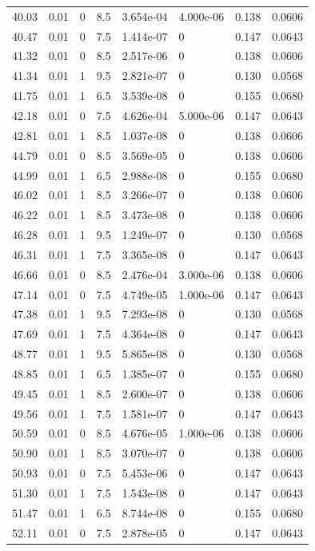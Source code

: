 \documentclass[preview]{standalone}
\begin{document}
{{{\begin{tabular}{L{1.2cm}C{1.2cm} C{0.3cm}C{0.5cm} C{1.4cm}C{1.4cm} C{1.4cm}C{1.4cm}}
  40.03  &  0.01  & 0     & 8.5 &  3.654e-04  & 4.000e-06  & 0.138 &  0.0606   \\ 
  40.47  &  0.01  & 0     & 7.5 &  1.414e-07  & 0  & 0.147 &  0.0643   \\ 
  41.32  &  0.01  & 0     & 8.5 &  2.517e-06  & 0  & 0.138 &  0.0606   \\ 
  41.34  &  0.01  & 1     & 9.5 &  2.821e-07  & 0  & 0.130 &  0.0568   \\ 
  41.75  &  0.01  & 1     & 6.5 &  3.539e-08  & 0  & 0.155 &  0.0680   \\ 
  42.18  &  0.01  & 0     & 7.5 &  4.626e-04  & 5.000e-06  & 0.147 &  0.0643   \\ 
  42.81  &  0.01  & 1     & 8.5 &  1.037e-08  & 0  & 0.138 &  0.0606   \\ 
  44.79  &  0.01  & 0     & 8.5 &  3.569e-05  & 0  & 0.138 &  0.0606   \\ 
  44.99  &  0.01  & 1     & 6.5 &  2.988e-08  & 0  & 0.155 &  0.0680   \\ 
  46.02  &  0.01  & 1     & 8.5 &  3.266e-07  & 0  & 0.138 &  0.0606   \\ 
  46.22  &  0.01  & 1     & 8.5 &  3.473e-08  & 0  & 0.138 &  0.0606   \\ 
  46.28  &  0.01  & 1     & 9.5 &  1.249e-07  & 0  & 0.130 &  0.0568   \\ 
  46.31  &  0.01  & 1     & 7.5 &  3.365e-08  & 0  & 0.147 &  0.0643   \\ 
  46.66  &  0.01  & 0     & 8.5 &  2.476e-04  & 3.000e-06  & 0.138 &  0.0606   \\ 
  47.14  &  0.01  & 0     & 7.5 &  4.749e-05  & 1.000e-06  & 0.147 &  0.0643   \\ 
  47.38  &  0.01  & 1     & 9.5 &  7.293e-08  & 0  & 0.130 &  0.0568   \\ 
  47.69  &  0.01  & 1     & 7.5 &  4.364e-08  & 0  & 0.147 &  0.0643   \\ 
  48.77  &  0.01  & 1     & 9.5 &  5.865e-08  & 0  & 0.130 &  0.0568   \\ 
  48.85  &  0.01  & 1     & 6.5 &  1.385e-07  & 0  & 0.155 &  0.0680   \\ 
  49.45  &  0.01  & 1     & 8.5 &  2.600e-07  & 0  & 0.138 &  0.0606   \\ 
  49.56  &  0.01  & 1     & 7.5 &  1.581e-07  & 0  & 0.147 &  0.0643   \\ 
  50.59  &  0.01  & 0     & 8.5 &  4.676e-05  & 1.000e-06  & 0.138 &  0.0606   \\ 
  50.90  &  0.01  & 1     & 8.5 &  3.070e-07  & 0  & 0.138 &  0.0606   \\ 
  50.93  &  0.01  & 0     & 7.5 &  5.453e-06  & 0  & 0.147 &  0.0643   \\ 
  51.30  &  0.01  & 1     & 7.5 &  1.543e-08  & 0  & 0.147 &  0.0643   \\ 
  51.47  &  0.01  & 1     & 6.5 &  8.744e-08  & 0  & 0.155 &  0.0680   \\ 
  52.11  &  0.01  & 0     & 7.5 &  2.878e-05  & 0  & 0.147 &  0.0643   \\ 
\hline 
\end{tabular} 

}}}
\end{document}
